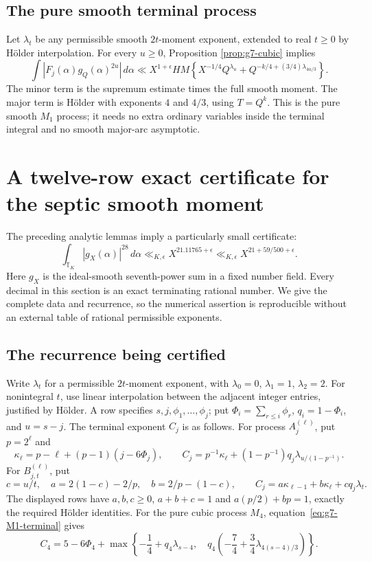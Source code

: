 \documentclass[11pt,reqno]{amsart}
\numberwithin{equation}{section}
\theoremstyle{definition}
\begin{document}
\subsection{The pure smooth terminal process}

Let $\lambda_t$ be any permissible smooth $2t$-moment exponent, extended to
real $t\ge0$ by H\"older interpolation.  For every $u\ge0$, Proposition
\ref{prop:g7-cubic} implies
\begin{equation}\label{eq:g7-M1-terminal}
 \int|F_j(\alpha)g_Q(\alpha)^{2u}|\,d\alpha
 \ll X^{1+\epsilon}HM
 \left\{X^{-1/4}Q^{\lambda_u}
       +Q^{-k/4+(3/4)\lambda_{4u/3}}\right\}.
\end{equation}
The minor term is the supremum estimate times the full smooth moment.
The major term is H\"older with exponents $4$ and $4/3$, using
$T=Q^k$.  This is the pure smooth $M_1$ process; it needs no extra ordinary
variables inside the terminal integral and no smooth major-arc asymptotic.


\section{A twelve-row exact certificate for the septic smooth moment}
\label{sec:g7-certificate}

The preceding analytic lemmas imply a particularly small certificate:
\begin{equation}\label{eq:g7-smooth28}
 \int_{\mathbb T_K}|g_X(\alpha)|^{28}\,d\alpha
       \ll_{K,\epsilon}X^{21.11765+\epsilon}
       \ll_{K,\epsilon}X^{21+59/500+\epsilon}.
\end{equation}
Here $g_X$ is the ideal-smooth seventh-power sum in a fixed number field.
Every decimal in this section is an exact terminating rational number.
We give the complete data and recurrence, so the numerical assertion is
reproducible without an external table of rational permissible exponents.

\subsection{The recurrence being certified}

Write $\lambda_t$ for a permissible $2t$-moment exponent, with
$\lambda_0=0$, $\lambda_1=1$, $\lambda_2=2$.
For nonintegral $t$, use linear interpolation between the adjacent integer
entries, justified by H\"older.  A row specifies $s,j,\phi_1,\ldots,\phi_j$;
put $\Phi_i=\sum_{r\le i}\phi_r$, $q_i=1-\Phi_i$, and $u=s-j$.
The terminal exponent $C_j$ is as follows.
For process $A_j^{(\ell)}$, put $p=2^\ell$ and
\[
 \kappa_\ell=p-\ell+(p-1)(j-6\Phi_j),\qquad
 C_j=p^{-1}\kappa_\ell+(1-p^{-1})q_j
                \lambda_{u/(1-p^{-1})}.
\]
For $B_{j,t}^{(\ell)}$, put
\[
 c=u/t,\quad a=2(1-c)-2/p,\quad b=2/p-(1-c),
 \qquad C_j=a\kappa_{\ell-1}+b\kappa_\ell+cq_j\lambda_t.
\]
The displayed rows have $a,b,c\ge0$, $a+b+c=1$ and
$a(p/2)+bp=1$, exactly the required H\"older identities.
For the pure cubic process $M_4$, equation~\eqref{eq:g7-M1-terminal} gives
\[
 C_4=5-6\Phi_4+
 \max\left\{-\frac14+q_4\lambda_{s-4},\quad
      q_4\left(-\frac74+\frac34\lambda_{4(s-4)/3}\right)\right\}.
\]
\end{document}
